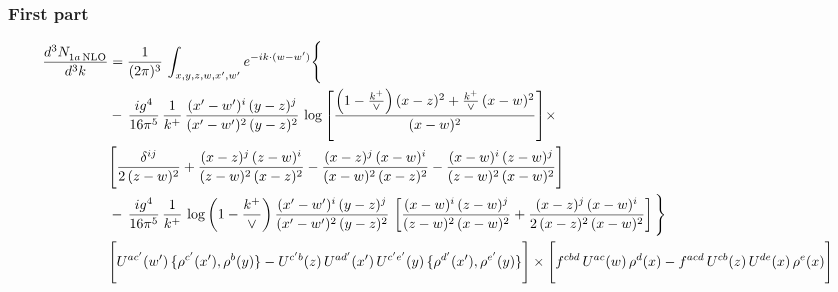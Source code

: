 \documentclass[9pt]{article}
\numberwithin{equation}{section}
\begin{document}
\subsubsection{First part}
\begin{align}
 \frac{d^{3}N_{1a\,\rm NLO}^{\rm}}{d^{3}k}  & =     \frac{1}{(2\pi)^{3}}\,\int_{x,y,z,w,x',w^{\prime}} e^{-ik\cdot (w-w')}\Bigg\{\notag \\
& -\, \frac{ig^{4}}{16\pi^{5}}\,\frac{1}{k^{+}}\, \frac{(x'-w')^{i}\,(y-z)^{j}}{(x'-w')^{2}\,(y-z)^{2}}\,\log{\left[\frac{\left(1-\frac{k^{+}}{\vee}\right)(x-z)^{2}+\frac{k^{+}}{\vee}\,(x-w)^{2}}{(x-w)^{2}}\right]}\times\notag \\ &  \Bigg[\frac{\delta^{ij}}{2\,(z-w)^{2}}+\frac{(x-z)^{j}\,(z-w)^{i}}{(z-w)^{2}\,(x-z)^{2}}-\frac{(x-z)^{j}\,(x-w)^{i}}{(x-w)^{2}\,(x-z)^{2}}-\frac{(x-w)^{i}\,(z-w)^{j}}{(z-w)^{2}\,(x-w)^{2}}\Bigg] \notag \\
& -\, \frac{ig^{4}}{16\pi^{5}}\,\frac{1}{k^{+}}\,\log{\left(1-\frac{k^{+}}{\vee}\right)}\,\frac{(x'-w')^{i}\,(y-z)^{j}}{(x'-w')^{2}\,(y-z)^{2}}\,\left[\frac{(x-w)^{i}\,(z-w)^{j}}{(z-w)^{2}\,(x-w)^{2}}+\frac{(x-z)^{j}\,(x-w)^{i}}{2\,(x-z)^{2}\, (x-w)^{2}}\right]\Bigg\} \notag \\ & \Bigg[U^{ac'}(w')\,\{\rho^{c'}(x'),\rho^{b}(y)\}-U^{c'b}(z)\,U^{ad'}(x')\,U^{c'e'}(y)\, \{\rho^{d'}(x'),\rho^{e'}(y)\}\Bigg]\times \Bigg[f^{cbd}\,U^{ac}(w)\,\rho^{d}(x)-f^{acd}\, U^{cb}(z)\,U^{de}(x)\,\rho^{e}(x)\Bigg]
\end{align}
\end{document}
